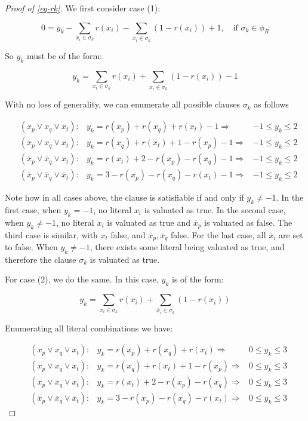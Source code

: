 \documentclass{amsart}
\newcommand{\ov}{\overline}
\theoremstyle{plain}
\renewcommand{\implies}{\Rightarrow}
\begin{document}
\begin{proof}[Proof of \autoref{eq-rk}]
  We first consider case (1):

  \begin{equation*}
    0 = y_k-\sum_{x_i\in\sigma_k} r(x_i)-\sum_{\ov{x}_i\in\sigma_k} (1-r(x_i))+1,\quad\text{if }
    \sigma_k\in\phi_R
  \end{equation*}

  So $y_k$ must be of the form:

  \begin{equation*}
    y_k=\sum_{x_i\in\sigma_k} r(x_i)+\sum_{\ov{x}_i\in\sigma_k} (1-r(x_i))-1
  \end{equation*}

  With no loss of generality, we can enumerate all possible clauses $\sigma_k$ as follows

  \begin{align*}
    &(x_p\vee x_q\vee x_t): &y_k=r(x_p)+r(x_q)+r(x_t)-1\implies &-1\leq y_k\leq 2\\
    &(\ov{x}_p\vee x_q\vee x_t): &y_k=r(x_q)+r(x_t)+1-r(x_p)-1\implies &-1\leq y_k\leq 2\\
    &(\ov{x}_p\vee\ov{x}_q\vee x_t):&y_k=r(x_t)+2-r(x_p)-r(x_q)-1\implies &-1\leq y_k\leq 2\\
    &(\ov{x}_p\vee\ov{x}_q\vee\ov{x}_t):&y_k=3-r(x_p)-r(x_q)-r(x_t)-1\implies &-1\leq y_k\leq 2
  \end{align*}

  Note how in all cases above, the clause is satisfiable if and only if $y_k\neq -1$. In the first
  case, when $y_k=-1$, no literal $x_i$ is valuated as true. In the second case, when $y_k\neq -1$,
  no literal $x_i$ is valuated as true and $\ov{x}_p$ is valuated as false. The third case is
  similar, with $x_t$ false, and $\ov{x}_p,\ov{x}_q$ false. For the last case, all $\ov{x}_i$ are
  set to false. When $y_k\neq -1$, there exists some literal being valuated as true, and therefore
  the clause $\sigma_k$ is valuated as true.

  For case (2), we do the same. In this case, $y_k$ is of the form:

  \begin{equation*}
    y_k=\sum_{x_i\in\sigma_k} r(x_i)+\sum_{\ov{x}_i\in\sigma_k} (1-r(x_i))
  \end{equation*}

  Enumerating all literal combinations we have:

  \begin{align*}
    &(x_p\vee x_q\vee x_t): &y_k=r(x_p)+r(x_q)+r(x_t)\implies &0\leq y_k\leq 3\\
    &(\ov{x}_p\vee x_q\vee x_t): &y_k=r(x_q)+r(x_t)+1-r(x_p)\implies &0\leq y_k\leq 3\\
    &(\ov{x}_p\vee\ov{x}_q\vee x_t):&y_k=r(x_t)+2-r(x_p)-r(x_q)\implies &0\leq y_k\leq 3\\
    &(\ov{x}_p\vee\ov{x}_q\vee\ov{x}_t):&y_k=3-r(x_p)-r(x_q)-r(x_t)\implies &0\leq y_k\leq 3
  \end{align*}


\end{proof}
\end{document}
